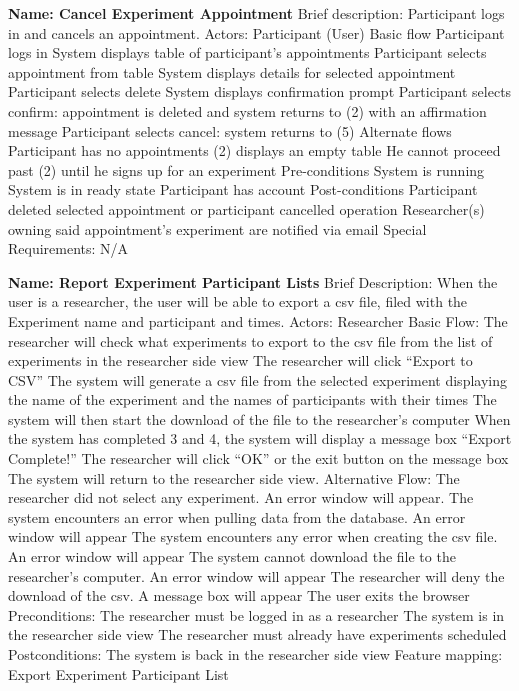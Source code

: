 \begin{outline}[enumerate]
\1 {\bf Name: Cancel Experiment Appointment}
\2 Brief description: Participant logs in and cancels an appointment.
\2 Actors: Participant (User)
\2 Basic flow
\3 Participant logs in
\3 System displays table of participant's appointments
\3 Participant selects appointment from table
\3 System displays details for selected appointment
\3 Participant selects delete
\3 System displays confirmation prompt
\3 Participant selects confirm: appointment is deleted and system returns to (2) with an affirmation message
\3 Participant selects cancel: system returns to (5)
\2 Alternate flows
\3 Participant has no appointments
\4 (2) displays an empty table
\4 He cannot proceed past (2) until he signs up for an experiment
\2 Pre-conditions
\3 System is running
\3 System is in ready state
\3 Participant has account
\2 Post-conditions
\3 Participant deleted selected appointment or participant cancelled operation
\3 Researcher(s) owning said appointment's experiment are notified via email
\2 Special Requirements:
\3 N/A


\1 {\bf Name: Report Experiment Participant Lists}
\2 Brief Description:  When the user is a researcher, the user will be able to export a csv file, filed with the Experiment name and participant and times.
\2 Actors: Researcher
\2 Basic Flow:
\3 The researcher will check what experiments to export to the csv file from the list of experiments in the researcher side view
\3 The researcher will click “Export to CSV”
\3 The system will generate a csv file from the selected experiment displaying the name of the experiment and the names of participants with their times
\3 The system will then start the download of the file to the researcher's computer
\3 When the system has completed 3 and 4, the system will display a message box “Export Complete!”
\3 The researcher will click “OK” or the exit button on the message box
\3 The system will return to the researcher side view.
\2 Alternative Flow:
\3 The researcher did not select any experiment.  An error window will appear.
\3 The system encounters an error when pulling data from the database. An error window will appear
\3 The system encounters any error when creating the csv file. An error window will appear
\3 The system cannot download the file to the researcher’s computer. An error window will appear
\3 The researcher will deny the download of the csv.  A message box will appear
\3 The user exits the browser
\2 Preconditions:
\3 The researcher must be logged in as a researcher
\3 The system is in the researcher side view
\3 The researcher must already have experiments scheduled
\2 Postconditions:
\3 The system is back in the researcher side view
\2 Feature mapping:
\3 Export Experiment Participant List


\end{outline}
